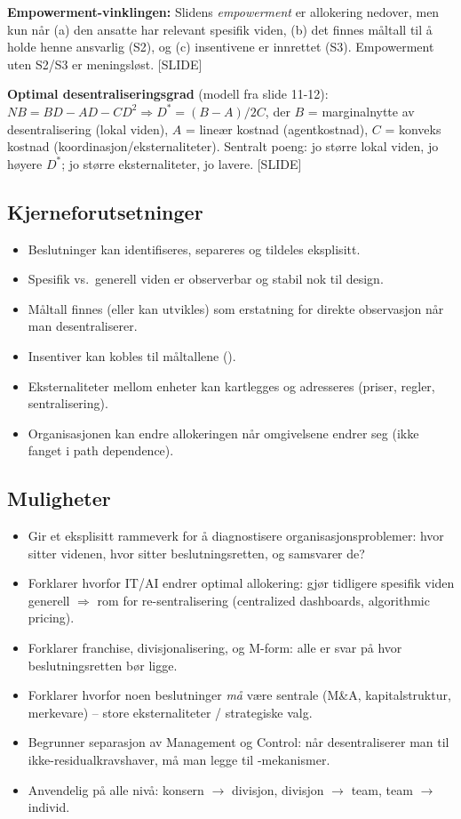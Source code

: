 \textbf{Empowerment-vinklingen:} Slidens \emph{empowerment} er allokering nedover, men kun når (a) den ansatte har relevant spesifik viden, (b) det finnes måltall til å holde henne ansvarlig (S2), og (c) insentivene er innrettet (S3). Empowerment uten S2/S3 er meningsløst. [SLIDE]

\textbf{Optimal desentraliseringsgrad} (modell fra slide 11-12):
$NB = BD - AD - CD^2 \Rightarrow D^* = (B-A)/2C$, der $B$ = marginalnytte av desentralisering (lokal viden), $A$ = lineær kostnad (agentkostnad), $C$ = konveks kostnad (koordinasjon/eksternaliteter). Sentralt poeng: jo større lokal viden, jo høyere $D^*$; jo større eksternaliteter, jo lavere. [SLIDE]

\subsection*{Kjerneforutsetninger}
\begin{itemize}
\item Beslutninger kan identifiseres, separeres og tildeles eksplisitt.
\item Spesifik vs.\ generell viden er observerbar og stabil nok til design.
\item Måltall finnes (eller kan utvikles) som erstatning for direkte observasjon når man desentraliserer.
\item Insentiver kan kobles til måltallene (\SThree).
\item Eksternaliteter mellom enheter kan kartlegges og adresseres (priser, regler, sentralisering).
\item Organisasjonen kan endre allokeringen når omgivelsene endrer seg (ikke fanget i path dependence).
\end{itemize}

\subsection*{Muligheter}
\begin{itemize}
\item Gir et eksplisitt rammeverk for å diagnostisere organisasjonsproblemer: hvor sitter videnen, hvor sitter beslutningsretten, og samsvarer de?
\item Forklarer hvorfor IT/AI endrer optimal allokering: gjør tidligere spesifik viden generell $\Rightarrow$ rom for re-sentralisering (centralized dashboards, algorithmic pricing).
\item Forklarer franchise, divisjonalisering, og M-form: alle er svar på hvor beslutningsretten bør ligge.
\item Forklarer hvorfor noen beslutninger \emph{må} være sentrale (M\&A, kapitalstruktur, merkevare) -- store eksternaliteter / strategiske valg.
\item Begrunner separasjon av Management og Control: når desentraliserer man til ikke-residualkravshaver, må man legge til -mekanismer.
\item Anvendelig på alle nivå: konsern $\to$ divisjon, divisjon $\to$ team, team $\to$ individ.
\end{itemize}

